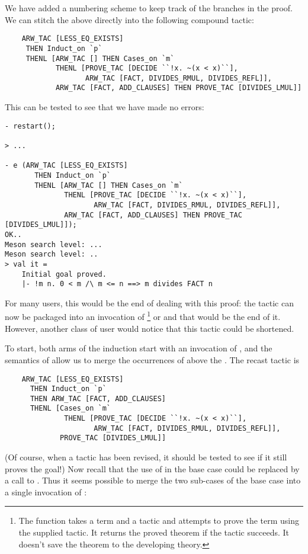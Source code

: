 We have added a numbering scheme to keep track of the branches in the
proof. We can stitch the above directly into the following compound
tactic:

{\small\begin{verbatim}
    ARW_TAC [LESS_EQ_EXISTS]
     THEN Induct_on `p`
     THENL [ARW_TAC [] THEN Cases_on `m`
            THENL [PROVE_TAC [DECIDE ``!x. ~(x < x)``],
                   ARW_TAC [FACT, DIVIDES_RMUL, DIVIDES_REFL]],
            ARW_TAC [FACT, ADD_CLAUSES] THEN PROVE_TAC [DIVIDES_LMUL]]
\end{verbatim}}

\noindent This can be tested to see that we have made no errors:

\begin{session}\begin{verbatim}
- restart();

> ...

- e (ARW_TAC [LESS_EQ_EXISTS]
       THEN Induct_on `p`
       THENL [ARW_TAC [] THEN Cases_on `m`
              THENL [PROVE_TAC [DECIDE ``!x. ~(x < x)``],
                     ARW_TAC [FACT, DIVIDES_RMUL, DIVIDES_REFL]],
              ARW_TAC [FACT, ADD_CLAUSES] THEN PROVE_TAC [DIVIDES_LMUL]]);
OK..
Meson search level: ...
Meson search level: ..
> val it =
    Initial goal proved.
    |- !m n. 0 < m /\ m <= n ==> m divides FACT n
\end{verbatim}\end{session}
    For many users, this would be the end of dealing with this proof:
    the tactic can now be packaged into an invocation of
    \footnote{The  function takes a term and a
      tactic and attempts to prove the term using the supplied tactic.
      It returns the proved theorem if the tactic succeeds.  It
      doesn't save the theorem to the developing theory.} or
     and that would be the end of it. However, another
    class of user would notice that this tactic could be shortened.

To start, both arms of the induction start with an invocation of
, and the semantics of  allow us to merge the
occurrences of  above the . The recast tactic
is
{\small\begin{verbatim}
    ARW_TAC [LESS_EQ_EXISTS]
      THEN Induct_on `p`
      THEN ARW_TAC [FACT, ADD_CLAUSES]
      THENL [Cases_on `m`
              THENL [PROVE_TAC [DECIDE ``!x. ~(x < x)``],
                     ARW_TAC [FACT, DIVIDES_RMUL, DIVIDES_REFL]],
             PROVE_TAC [DIVIDES_LMUL]]
\end{verbatim}}
(Of course, when a tactic has been revised, it should be tested to see
if it still proves the goal!) Now recall that the use of 
in the base case could be replaced by a call to . Thus
it seems possible to merge the two sub-cases of the base case into a
single invocation of :

